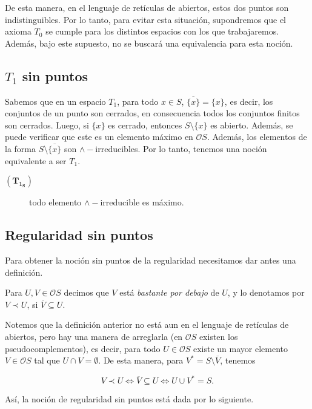 \documentclass{comunicaciones}
\begin{document}
De esta manera, en el lenguaje de retículas de abiertos, estos dos puntos son indistinguibles. Por lo tanto, para evitar esta situación, supondremos que el axioma $T_0$ se cumple para los distintos espacios con los que trabajaremos. Además, bajo este supuesto, no se buscará una equivalencia para esta noción.

\subsection{$T_1$ sin puntos}\label{T1s}

Sabemos que en un espacio $T_1$, para todo $x\in S$, $\overline{\{x\}}=\{x\}$, es decir, los conjuntos de un punto son cerrados, en consecuencia todos los conjuntos finitos son cerrados. Luego, si $\{x\}$ es cerrado, entonces $S\setminus \{x\}$ es abierto. Además, se puede verificar que este es un elemento máximo en $\mathcal{O}S$. Además, los elementos de la forma $S\setminus \overline{\{x\}}$ son $\wedge-$irreducibles. Por lo tanto, tenemos una noción equivalente a ser $T_1$.

\begin{description}
\item[$(\mathbf{T_{1_S}})$] todo elemento $\wedge-$irreducible es máximo.
\end{description}

\subsection{Regularidad sin puntos}

Para obtener la noción sin puntos de la regularidad necesitamos dar antes una definición.

\begin{dfn}\label{Bdebajo}
    Para $U, V\in \mathcal{O}S$ decimos que $V$ está \emph{bastante por debajo} de $U$, y lo denotamos por $V\prec U$, si $\overline{V}\subseteq U$.
\end{dfn}

Notemos que la definición anterior no está aun en el lenguaje de retículas de abiertos, pero hay una manera de arreglarla (en $\mathcal{O}S$ existen los pseudocomplementos), es decir, para todo $U\in \mathcal{O}S$ existe un mayor elemento $V\in \mathcal{O}S$ tal que $U\cap V=\emptyset$. De esta manera, para $V^*=S\setminus \overline{V}$, tenemos

\[
V\prec U \Leftrightarrow \overline{V}\subseteq U\Leftrightarrow U\cup V^*=S.
\]

Así, la noción de regularidad sin puntos está dada por lo siguiente.
\end{document}
